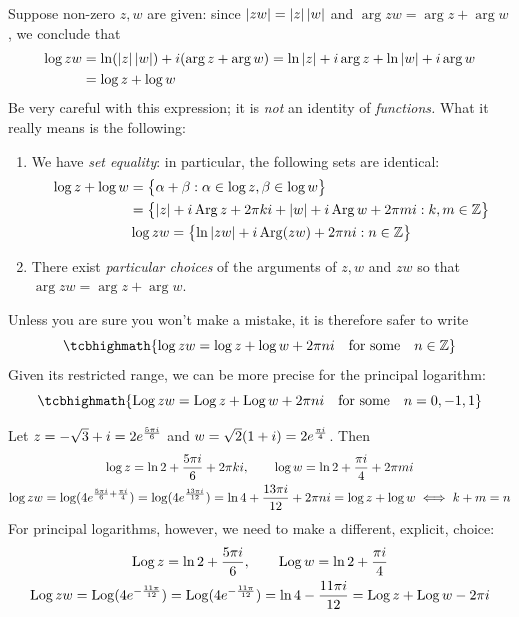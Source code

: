 Suppose non-zero $z,w$ are given: since $\left| zw\right|=\left| z\right|\left| w\right|$ and $\arg zw=\arg z+\arg w$, we conclude that
\begin{align*}
\log zw&=\ln(\left| z\right|\left| w\right|)+i(\arg z+\arg w)=\ln\left| z\right|+i\arg z+\ln\left| w\right|+i\arg w\\
&=\log z+\log w
\end{align*}
Be very careful with this expression; it is \emph{not} an identity of \emph{functions.} What it really means is the following:
\begin{enumerate}
  \item We have \emph{set equality}: in particular, the following sets are identical:
  \begin{gather*}
  \begin{aligned}
  \log z+\log w&=\bigl\{\alpha+\beta:\alpha\in\log z,\beta\in\log w\bigr\}\\
  &=\bigl\{\left| z\right|+i\operatorname{Arg} z+2\pi ki+\left| w\right|+i\operatorname{Arg} w+2\pi mi:k,m\in\mathbb{Z}\bigr\}
  \end{aligned}\\
  \log zw=\bigl\{\ln\left| zw\right|+i\operatorname{Arg}(zw)+2\pi ni:n\in\mathbb{Z}\bigr\} 
  \end{gather*}
  \item There exist \emph{particular choices} of the arguments of $z,w$ and $zw$ so that $\arg zw=\arg z+\arg w$.   
\end{enumerate}
Unless you are sure you won't make a mistake, it is therefore safer to write
\[\tcbhighmath{\log zw=\log z+\log w+2\pi ni\quad\text{for some}\quad n\in\Z}\]
Given its restricted range, we can be more precise for the principal logarithm:
\[\tcbhighmath{\Log zw=\Log z+\Log w+2\pi ni\quad\text{for some}\quad n=0,-1,1}\]


\begin{example}{}{}
Let $z=-\sqrt 3+i=2e^{\frac{5\pi i}{6}}$ and $w=\sqrt 2(1+i)=2e^{\frac{\pi i}{4}}$. Then
  \begin{gather*}
  \log z=\ln 2+\frac{5\pi i}6 +2\pi ki,\qquad \log w=\ln 2+\frac{\pi i}4+2\pi mi\\
  \log zw=\log(4e^{\frac{5\pi i}6+\frac{\pi i}4})=\log(4e^{\frac{13\pi i}{12}}) =\ln 4+\frac{13\pi i}{12}+2\pi ni =\log z+\log w \iff k+m=n
  \end{gather*}
  For principal logarithms, however, we need to make a different, explicit, choice:
  \begin{gather*}
  \operatorname{Log} z=\ln 2+\frac{5\pi i}6,\qquad \operatorname{Log} w=\ln 2+\frac{\pi i}4\\
  \operatorname{Log} zw=\operatorname{Log}(4e^{-\frac{11\pi}{12}}) =\operatorname{Log}(4e^{-\frac{11\pi}{12}})=\ln 4-\frac{11\pi i}{12} =\operatorname{Log} z+\operatorname{Log} w-2\pi i
  \end{gather*}
\end{example}

